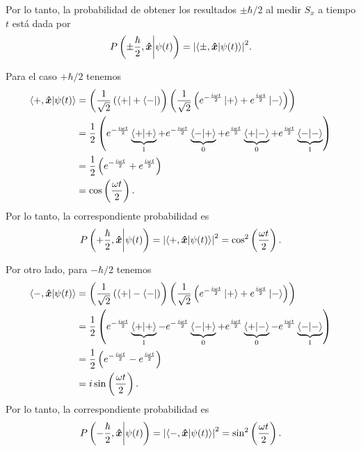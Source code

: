 \documentclass[10pt, a4paper]{article}
\newcommand{\wt}{\omega t}
\numberwithin{equation}{subsection}
\begin{document}
Por lo tanto, la probabilidad de obtener los resultados $\pm\hbar/2$ al medir
$S_x$ a tiempo $t$ está dada por
\begin{equation}
  P\left({\pm\frac{\hbar}{2},\vu*{x}}\middle|{\psi(t)}\right) =
  \abs{\braket{\pm,\vu*{x}}{\psi(t)}}^2.
\end{equation}

Para el caso $+\hbar/2$ tenemos
\begin{align}
  \braket{+,\vers{x}}{\psi(t)} &=
    \left(\frac{1}{\sqrt{2}}\left(\bra{+} + \bra{-}\right)\right)
    \left(\frac{1}{\sqrt{2}}\left(e^{-\frac{i\wt}{2}}\ket{+} +
                                  e^{ \frac{i\wt}{2}}\ket{-}
    \right)\right) \\
  &= \frac{1}{2}\left(
    e^{-\frac{i\wt}{2}}\underbrace{\braket{+}{+}}_{1} +
    e^{-\frac{i\wt}{2}}\underbrace{\braket{-}{+}}_{0} +
    e^{ \frac{i\wt}{2}}\underbrace{\braket{+}{-}}_{0} +
    e^{ \frac{i\wt}{2}}\underbrace{\braket{-}{-}}_{1}
  \right) \\
  &= \frac{1}{2}\left(
    e^{-\frac{i\wt}{2}} +
    e^{ \frac{i\wt}{2}}
  \right) \\
  &= \cos\left(\frac{\wt}{2}\right).
\end{align}
Por lo tanto, la correspondiente probabilidad es
\begin{equation}
  \ProbRes{+\frac{\hbar}{2},\vers{x}}{\psi(t)} =
  \abs{\braket{+,\vers{x}}{\psi(t)}}^2 =
  \cos^2\left(\frac{\wt}{2}\right).
\end{equation}

Por otro lado, para $-\hbar/2$ tenemos
\begin{align}
  \braket{-,\vers{x}}{\psi(t)} &=
    \left(\frac{1}{\sqrt{2}}\left(\bra{+} - \bra{-}\right)\right)
    \left(\frac{1}{\sqrt{2}}\left(e^{-\frac{i\wt}{2}}\ket{+} +
                                  e^{ \frac{i\wt}{2}}\ket{-}
    \right)\right) \\
  &= \frac{1}{2}\left(
    e^{-\frac{i\wt}{2}}\underbrace{\braket{+}{+}}_{1} -
    e^{-\frac{i\wt}{2}}\underbrace{\braket{-}{+}}_{0} +
    e^{ \frac{i\wt}{2}}\underbrace{\braket{+}{-}}_{0} -
    e^{ \frac{i\wt}{2}}\underbrace{\braket{-}{-}}_{1}
  \right) \\
  &= \frac{1}{2}\left(
    e^{-\frac{i\wt}{2}} -
    e^{ \frac{i\wt}{2}}
  \right) \\
  &= i\sin\left(\frac{\wt}{2}\right).
\end{align}
Por lo tanto, la correspondiente probabilidad es
\begin{equation}
  \ProbRes{-\frac{\hbar}{2},\vers{x}}{\psi(t)} =
  \abs{\braket{-,\vers{x}}{\psi(t)}}^2 =
  \sin^2\left(\frac{\wt}{2}\right).
\end{equation}
\end{document}
